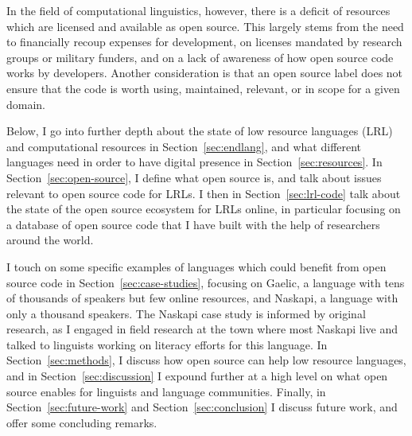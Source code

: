 In the field of computational linguistics, however, there is a deficit of resources which are licensed and available as open source. This largely stems from the need to financially recoup expenses for development, on licenses mandated by research groups or military funders, and on a lack of awareness of how open source code works by developers. Another consideration is that an open source label does not ensure that the code is worth using, maintained, relevant, or in scope for a given domain.

%

Below, I go into further depth about the state of low resource languages (LRL) and computational resources in Section~\ref{sec:endlang}, and what different languages need in order to have digital presence in Section~\ref{sec:resources}. In Section~\ref{sec:open-source}, I define what open source is, and talk about issues relevant to open source code for LRLs. I then in Section~\ref{sec:lrl-code} talk about the state of the open source ecosystem for LRLs online, in particular focusing on a database of open source code that I have built with the help of researchers around the world.

I touch on some specific examples of languages which could benefit from open source code in Section~\ref{sec:case-studies}, focusing on Gaelic, a language with tens of thousands of speakers but few online resources, and Naskapi, a language with only a thousand speakers. The Naskapi case study is informed by original research, as I engaged in field research at the town where most Naskapi live and talked to linguists working on literacy efforts for this language. In Section~\ref{sec:methods}, I discuss how open source can help low resource languages, and in Section~\ref{sec:discussion} I expound further at a high level on what open source enables for linguists and language communities. Finally, in Section~\ref{sec:future-work} and Section~\ref{sec:conclusion} I discuss future work, and offer some concluding remarks.


